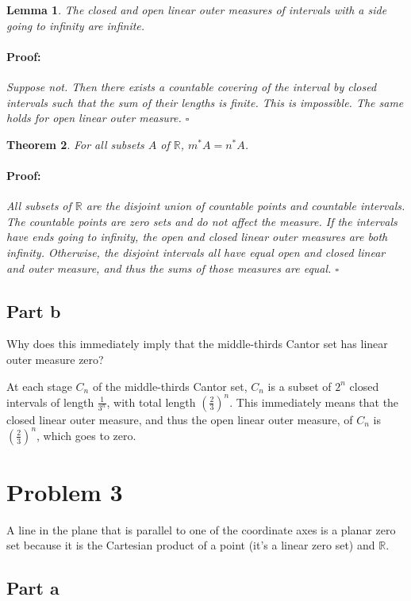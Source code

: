 \documentclass{article}
\newenvironment{proof}{\paragraph{Proof:}}{\hfill$\square$}
\newtheorem{theorem}{Theorem}
\newtheorem{lemma}[theorem]{Lemma}
\newcommand{\R}{\mathbb{R}}
\begin{document}
\begin{lemma}
The closed and open linear outer measures of intervals with a side going to infinity are infinite.
\begin{proof}
Suppose not. Then there exists a countable covering of the interval by closed intervals such that the sum of their lengths is finite. This is impossible. The same holds for open linear outer measure. 
\end{proof}
\end{lemma}

\begin{theorem}
For all subsets $A$ of $\R$, $m^*A = n^*A$.
\begin{proof}
All subsets of $\R$ are the disjoint union of countable points and countable intervals. The countable points are zero sets and do not affect the measure. If the intervals have ends going to infinity, the open and closed linear outer measures are both infinity. Otherwise, the disjoint intervals all have equal open and closed linear and outer measure, and thus the sums of those measures are equal.
\end{proof}
\end{theorem}

\subsection*{Part b}

Why does this immediately imply that the middle-thirds Cantor set has linear outer measure zero?

At each stage $C_n$ of the middle-thirds Cantor set, $C_n$ is a subset of $2^n$ closed intervals of length $\frac{1}{3^n}$, with total length $(\frac{2}{3})^n$. This immediately means that the closed linear outer measure, and thus the open linear outer measure, of $C_n$ is $(\frac{2}{3})^n$, which goes to zero.

\section*{Problem 3}

A line in the plane that is parallel to one of the coordinate axes is a planar zero set because it is the Cartesian product of a point (it's a linear zero set) and $\R$.

\subsection*{Part a}
\end{document}
